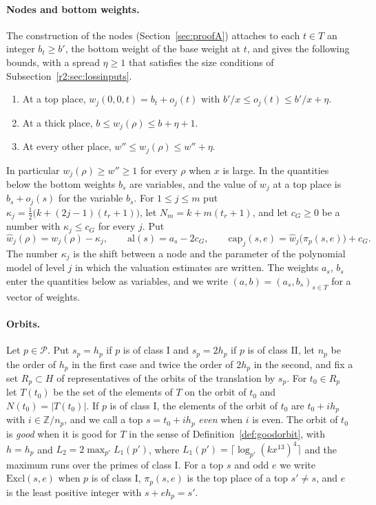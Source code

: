 \paragraph{Nodes and bottom weights.} The construction of the nodes (Section~\ref{sec:proofA}) attaches to each $t\in T$ an integer $b_t\ge b'$, the bottom weight of the base weight at $t$, and gives the following bounds, with a spread $\eta\ge1$ that satisfies the size conditions of Subsection~\ref{r2:sec:lossinputs}.
\begin{enumerate}
\item[(W1)] At a top place, $w_j(0,0,t)=b_t+o_j(t)$ with $b'/x\le o_j(t)\le b'/x+\eta$.
\item[(W2)] At a thick place, $b\le w_j(\rho)\le b+\eta+1$.
\item[(W3)] At every other place, $w''\le w_j(\rho)\le w''+\eta$.
\end{enumerate}
In particular $w_j(\rho)\ge w''\ge1$ for every $\rho$ when $x$ is large. In the quantities below the bottom weights $b_s$ are variables, and the value of $w_j$ at a top place is $b_s+o_j(s)$ for the variable $b_s$. For $1\le j\le m$ put $\kappa_j=\frac12\big(k+(2j-1)(t_r+1)\big)$, let $N_m=k+m(t_r+1)$, and let $c_G\ge0$ be a number with $\kappa_j\le c_G$ for every $j$. Put
\[
\hat w_j(\rho)=w_j(\rho)-\kappa_j,\qquad \mathrm{al}(s)=a_s-2c_G,\qquad \mathrm{cap}_j(s,e)=\hat w_j\big(\pi_p(s,e)\big)+c_G .
\]
The number $\kappa_j$ is the shift between a node and the parameter of the polynomial model of level $j$ in which the valuation estimates are written. The weights $a_s$, $b_s$ enter the quantities below as variables, and we write $(a,b)=(a_s,b_s)_{s\in T}$ for a vector of weights.

\paragraph{Orbits.} Let $p\in\mathcal P$. Put $s_p=h_p$ if $p$ is of class I and $s_p=2h_p$ if $p$ is of class II, let $n_p$ be the order of $h_p$ in the first case and twice the order of $2h_p$ in the second, and fix a set $R_p\subset H$ of representatives of the orbits of the translation by $s_p$. For $t_0\in R_p$ let $T(t_0)$ be the set of the elements of $T$ on the orbit of $t_0$ and $N(t_0)=\lvert T(t_0)\rvert$. If $p$ is of class I, the elements of the orbit of $t_0$ are $t_0+ih_p$ with $i\in\mathbb Z/n_p$, and we call a top $s=t_0+ih_p$ \emph{even} when $i$ is even. The orbit of $t_0$ is \emph{good} when it is good for $T$ in the sense of Definition~\ref{def:goodorbit}, with $h=h_p$ and $L_2=2\max_{p'}L_1(p')$, where $L_1(p')=\lceil\log_{p'}(kx^{13})^4\rceil$ and the maximum runs over the primes of class I. For a top $s$ and odd $e$ we write $\mathrm{Excl}(s,e)$ when $p$ is of class I, $\pi_p(s,e)$ is the top place of a top $s'\ne s$, and $e$ is the least positive integer with $s+eh_p=s'$.

